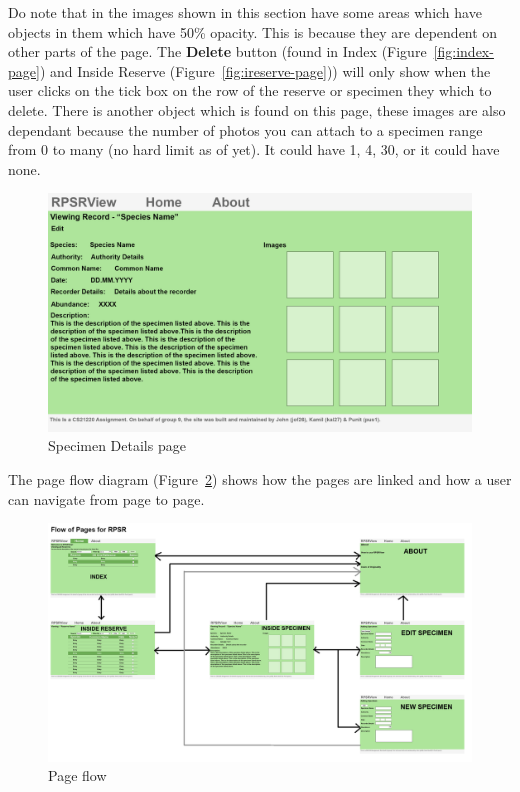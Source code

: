 \documentclass[12pt]{article}
\begin{document}
		\noindent Do note that in the images shown in this section have some areas which have objects in them which have 50\% opacity. This is because they are dependent on other parts of the page. The \textbf{Delete} button (found in Index (Figure~\ref{fig:index-page}) and Inside Reserve (Figure~\ref{fig:ireserve-page})) will only show when the user clicks on the tick box on the row of the reserve or specimen they which to delete. There is another object which is found on this page, these images are also dependant because the number of photos you can attach to a specimen range from 0 to many (no hard limit as of yet). It could have 1, 4, 30, or it could have none.

		\begin{figure}[H]
			\begin{center}
				\includegraphics[scale=0.20]{web-InsideSpecimenPLAN}
			\end{center}
			\caption{Specimen Details page}
			\label{fig:details-page}
		\end{figure}

		\noindent The page flow diagram (Figure~\ref{fig:pflow-page}) shows how the pages are linked and how a user can navigate from page to page.

		\begin{figure}[H]
			\begin{center}
				\includegraphics[scale=0.20]{web-FlowPLAN}
			\end{center}
			\caption{Page flow}
			\label{fig:pflow-page}
		\end{figure}
\end{document}
